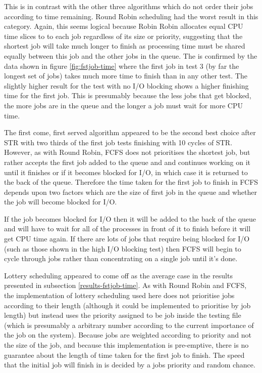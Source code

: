 \documentclass{acm_proc_article-sp}
\begin{document}
This is in contrast with the other three algorithms which do not order their jobs according to time remaining. Round Robin scheduling had the worst result in this category. Again, this seems logical because Robin Robin allocates equal CPU time slices to to each job regardless of its size or priority, suggesting that the shortest job will take much longer to finish as processing time must be shared equally between this job and the other jobs in the queue. The is confirmed by the data shown in figure \ref{fig:fstjob-time} where the first job in test 3 (by far the longest set of jobs) takes much more time to finish than in any other test. The slightly higher result for the test with no I/O blocking shows a higher finishing time for the first job. This is presumably because the less jobs that get blocked, the more jobs are in the queue and the longer a job must wait for more CPU time.

The first come, first served algorithm appeared to be the second best choice after STR with two thirds of the first job tests finishing with 10 cycles of STR. However, as with Round Robin, FCFS does not prioritises the shortest job, but rather accepts the first job added to the queue and and continues working on it until it finishes or if it becomes blocked for I/O, in which case it is returned to the back of the queue. Therefore the time taken for the first job to finish in FCFS depends upon two factors which are the size of first job in the queue and whether the job will become blocked for I/O. 

If the job becomes blocked for I/O then it will be added to the back of the queue and will have to wait for all of the processes in front of it to finish before it will get CPU time again. If there are lots of jobs that require being blocked for I/O (such as those shown in the high I/O blocking test) then FCFS will begin to cycle through jobs rather than concentrating on a single job until it's done.

Lottery scheduling appeared to come off as the average case in the results presented in subsection \ref{results-fstjob-time}. As with Round Robin and FCFS, the implementation of lottery scheduling used here does not prioritise jobs according to their length (although it could be implemented to prioritise by job length) but instead uses the priority assigned to be job inside the testing file (which is presumably a arbitrary number according to the current importance of the job on the system). Because jobs are weighted according to priority and not the size of the job, and because this implementation is pre-emptive, there is no guarantee about the length of time taken for the first job to finish. The speed that the initial job will finish in is decided by a jobs priority and random chance.
\end{document}
